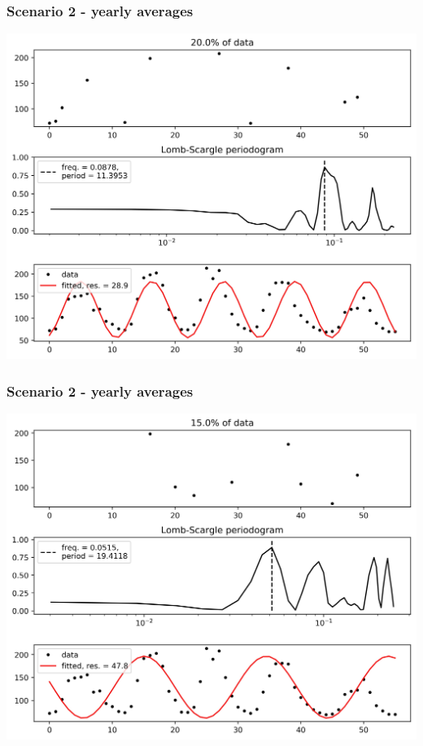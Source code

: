 \documentclass{beamer}
\begin{document}
\begin{frame}
\frametitle{Scenario 2 - yearly averages}
\begin{center}
\includegraphics[scale=0.55]{../scripts/dataset3/periodograms_ny2.0_model1_pg0.8.jpg}
\end{center}
\end{frame}
\begin{frame}
\frametitle{Scenario 2 - yearly averages}
\begin{center}
\includegraphics[scale=0.55]{../scripts/dataset3/periodograms_ny2.0_model1_pg0.85.jpg}
\end{center}
\end{frame}
\end{document}
